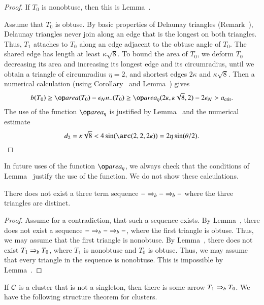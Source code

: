 \begin{proof}  
  If $T_0$ is nonobtuse, then this is Lemma~.

  Assume that $T_0$ is obtuse.  By basic properties of Delaunay
  triangles (Remark~), Delaunay triangles never join
  along an edge that is the longest on both triangles.  Thus, $T_1$
  attaches to $T_0$ along an edge adjacent to the obtuse angle of
  $T_0$.  The shared edge has length at least $\kappa\sqrt8$.  To
  bound the area of $T_0$, we deform $T_0$ decreasing its area and
  increasing its longest edge and its circumradius, until we obtain a
  triangle of circumradius $\eta=2$, and shortest edges $2\kappa$ and
  $\kappa\sqrt{8}$.  Then a numerical calculation (using
  Corollary~ and Lemma~) gives
\[
b(T_0) \ge \area(T_0) - \epsN n_-(T_0) \ge 
\areta(2\kappa,\kappa\sqrt{8},2) - 2\epsN > \acrit.
\] 
The use of the function $\areta$ is justified by
Lemma~ and the numerical estimate
\[
d_2 = \kappa\sqrt8 
<  4 \sin(\arc(2,2,2\kappa)) = 2\eta\sin(\theta/2).
\] 
\end{proof}

In future uses of the function $\areta$, we always check that the
conditions of Lemma~ justify the use of the function.
We do not show these calculations.

\begin{lemma}  There does not exist a three
  term sequence $- \Rightarrow_{b} -\Rightarrow_{b} -$ where the three triangles are
  distinct.
\end{lemma}

\begin{proof}  
  Assume for a contradiction, that such a sequence exists.  By
  Lemma~, there does not exist a sequence $- \Rightarrow_{b} -
  \Rightarrow_{b} -$, where the first triangle is obtuse.  Thus, we may assume
  that the first triangle is nonobtuse.  By Lemma~,
  there does not exist $T_1\Rightarrow_{b} T_0$, where $T_1$ is nonobtuse and
  $T_0$ is obtuse.  Thus, we may assume that every triangle in the
  sequence is nonobtuse.  This is impossible by
  Lemma~.
\end{proof}

If $\mathcal C$ is a cluster that is not a singleton, then there is
some arrow $T_1\Rightarrow_{b} T_0$.  We have the following structure
theorem for clusters.

